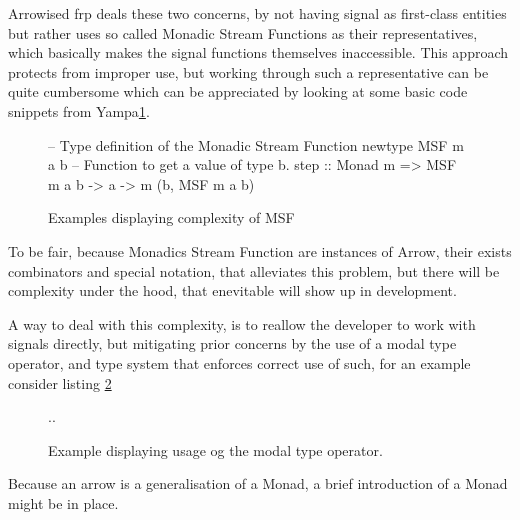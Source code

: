 \par Arrowised \acrshort{frp} deals these two concerns, by not having signal as first-class entities but rather uses so called Monadic Stream Functions as their representatives, which basically makes the signal functions themselves inaccessible. This approach protects from improper use, but working through such a representative can be quite cumbersome which can be appreciated by looking at some basic code snippets from Yampa\parencite{runtimeVerification}\ref{lst:yampaSnipppets}.
\begin{figure}
    \centering
    \begin{hscode}
        -- Type definition of the Monadic Stream Function
        newtype MSF m a b
        -- Function to get a value of type b. 
        step :: Monad m => MSF m a b -> a -> m (b, MSF m a b)
    \end{hscode}
    \caption{Examples displaying complexity of MSF \parencite{runtimeVerification}}
    \label{lst:yampaSnipppets}
\end{figure}
To be fair, because Monadics Stream Function are instances of Arrow, their exists combinators and special notation\parencite{paterson}, that alleviates this problem, but there will be complexity under the hood, that enevitable will show up in development. 

\par A way to deal with this complexity, is to reallow the developer to work with signals directly, but mitigating prior concerns by the use of a modal type operator, and type system that enforces correct use of such, for an example consider listing \ref{lst:modalExample}
\begin{figure}
    \centering
    \begin{hscode}
      ..
    \end{hscode}
    \caption{Example displaying usage og the modal type operator.}
    \label{lst:modalExample}
\end{figure}




Because an arrow is a generalisation of a Monad, a brief introduction of a Monad might be in place.
